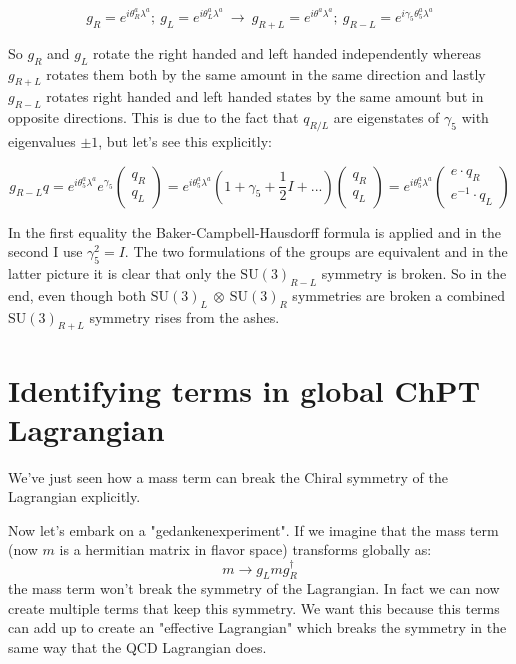 \documentclass[a4,10pt,titlepage]{article}
\renewcommand\[{\begin{equation*}}
\renewcommand\]{\end{equation*}}
\newcommand{\be}{\begin{equation}}
\newcommand{\ee}{\end{equation}}
\numberwithin{equation}{section}
\newcommand{\ot}{\:\otimes\:}
\newcommand{\half}{\frac{1}{2}}
\begin{document}
\be
g_R=e^{i\theta^{a}_R \lambda^a}; \ g_L=e^{i\theta^{a}_L \lambda^a} \ \rightarrow \ g_{R+L}=e^{i\theta^{a} \lambda^a}; \ g_{R-L}=e^{i\gamma_5\theta^{a}_5 \lambda^a}
\ee 

So $g_R$ and $g_L$ rotate the right handed and left handed independently whereas $g_{R+L}$ rotates them both by the same amount in the same direction and lastly $g_{R-L}$ rotates right handed and left handed states by the same amount but in opposite directions. This is due to the fact that $q_{R/L}$ are eigenstates of $\gamma_5$ with eigenvalues $\pm1$, but let's see this explicitly:

\be
g_{R-L}q=e^{i\theta^{a}_5\lambda^a}e^{\gamma_5} \begin{pmatrix}
    q_R\\
    q_L
\end{pmatrix} = e^{i\theta^{a}_5\lambda^a}(1+\gamma_5+\half I+...) \begin{pmatrix}
    q_R\\
    q_L
\end{pmatrix} = e^{i\theta^{a}_5\lambda^a}\begin{pmatrix}
    e\cdot q_R\\
    e^{-1}\cdot q_L
\end{pmatrix}
\ee

In the first equality the Baker-Campbell-Hausdorff formula is applied and in the second I use $\gamma_5^2=I$. The two formulations of the groups are equivalent and in the latter picture it is clear that only the $\text{SU}(3)_{R-L}$ symmetry is broken. So in the end, even though both $\text{SU}(3)_L\ot\text{SU}(3)_R$ symmetries are broken a combined $\text{SU}(3)_{R+L}$ symmetry rises from the ashes.

\section{Identifying terms in global ChPT Lagrangian}
We've just seen how a mass term can break the Chiral symmetry of the Lagrangian explicitly.

Now let's embark on a "gedankenexperiment". If we imagine that the mass term (now $m$ is a hermitian matrix in flavor space) transforms globally as:
\be
m\rightarrow g_L m g_R^\dagger
\ee
the mass term won't break the symmetry of the Lagrangian. In fact we can now create multiple terms that keep this symmetry. We want this because this terms can add up to create an "effective Lagrangian" which breaks the symmetry in the same way that the QCD Lagrangian does.
\end{document}
